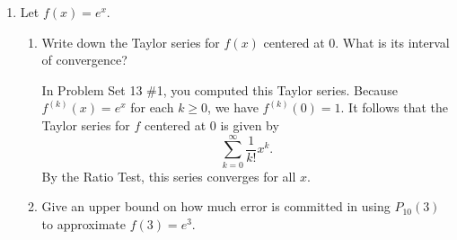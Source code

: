 \documentclass[main]{subfiles}
\begin{document}
\begin{enumerate}
\begin{enumerate}
    \item
    \begin{problem}[1.5in]
    Come up with a strategy for deciding what order of tests you should try when you encounter a new series.
    \end{problem}
\end{enumerate}



\pspace{\newpage}
\begin{problemonly}
\begin{framed}
\textbf{Theorem:} A function $f(x)$ is \textit{equal} to its Taylor series on its interval of convergence if and only if the exact error from its $n$th degree Taylor approximation approaches 0 as $n$ approaches $\infty$. That is:
$$f(x)=\text{ Taylor series of } f(x) \qquad \Longleftrightarrow \qquad \lim_{n\to \infty} \left|f(x)-P_n(x)\right|=0$$
for all $x$ in the interval of convergence.
\end{framed}
\end{problemonly}


\item 

  Let $f(x) = e^{x}$.  
  \begin{enumerate}
     \item 
     \begin{problem}[1in]
       Write down the Taylor series for $f(x)$ centered at $0$.  What is its interval of convergence?
     \end{problem}

     \begin{solution}
       In Problem Set 13 \#1, you computed this Taylor series.  Because $f^{(k)}(x) = e^{x}$ for each $k \geq 0$,
       we have $f^{(k)}(0) = 1$.  It follows that the Taylor series for $f$ centered at $0$ is given by
       $$
	 \sum_{k = 0}^{\infty} \frac{1}{k!} x^{k}.
       $$
       By the Ratio Test, this series converges for all $x$.
     \end{solution}


     \item 
     \begin{problem}[1in]
       Give an upper bound on how much error is committed in using
       $P_{10}(3)$ to approximate $f(3) = e^{3}$.
     \end{problem}


\end{enumerate}
\end{enumerate}
\end{document}
